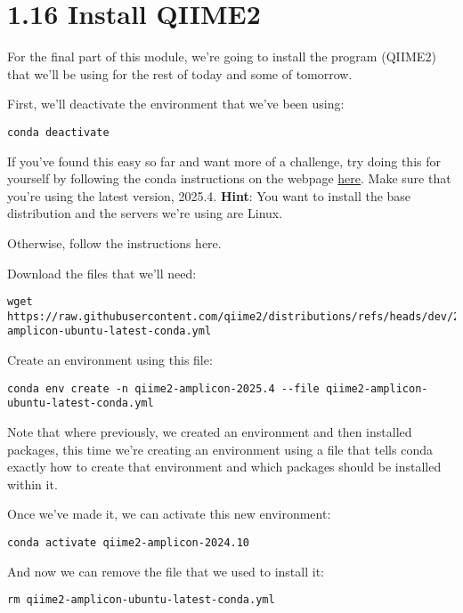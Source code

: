 \documentclass[
]{book}
\begin{document}
\section{1.16 Install QIIME2}\label{install-qiime2}

For the final part of this module, we're going to install the program (QIIME2) that we'll be using for the rest of today and some of tomorrow.

First, we'll deactivate the environment that we've been using:

\begin{verbatim}
conda deactivate
\end{verbatim}

If you've found this easy so far and want more of a challenge, try doing this for yourself by following the conda instructions on the webpage \href{https://library.qiime2.org/quickstart/amplicon\#using-conda}{here}. Make sure that you're using the latest version, 2025.4.
\textbf{Hint}: You want to install the base distribution and the servers we're using are Linux.

Otherwise, follow the instructions here.

Download the files that we'll need:

\begin{verbatim}
wget https://raw.githubusercontent.com/qiime2/distributions/refs/heads/dev/2025.4/amplicon/released/qiime2-amplicon-ubuntu-latest-conda.yml
\end{verbatim}

Create an environment using this file:

\begin{verbatim}
conda env create -n qiime2-amplicon-2025.4 --file qiime2-amplicon-ubuntu-latest-conda.yml
\end{verbatim}

Note that where previously, we created an environment and then installed packages, this time we're creating an environment using a file that tells conda exactly how to create that environment and which packages should be installed within it.

Once we've made it, we can activate this new environment:

\begin{verbatim}
conda activate qiime2-amplicon-2024.10
\end{verbatim}

And now we can remove the file that we used to install it:

\begin{verbatim}
rm qiime2-amplicon-ubuntu-latest-conda.yml
\end{verbatim}
\end{document}
